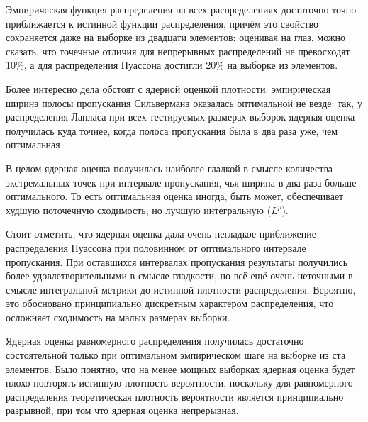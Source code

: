 Эмпирическая функция распределения на всех распределениях достаточно точно приближается к истинной функции распределения, причём это свойство сохраняется даже на выборке из двадцати элементов: оценивая на глаз, можно сказать, что точечные отличия для непрерывных распределений не превосходят 10\%, а для распределения Пуассона достигли 20\% на выборке из 
 элементов.
 
 Более интересно дела обстоят с ядерной оценкой плотности: эмпирическая ширина полосы пропускания Сильвермана оказалась оптимальной не везде: так, у распределения Лапласа при всех тестируемых размерах выборок ядерная оценка получилась куда точнее, когда полоса пропускания была в два раза уже, чем оптимальная
 
 В целом ядерная оценка получилась наиболее гладкой в смысле количества экстремальных точек при интервале пропускания, чья ширина в два раза больше оптимального. То есть оптимальная оценка иногда, быть может, обеспечивает худшую поточечную сходимость, но лучшую интегральную ($L^p$).
 
 Стоит отметить, что ядерная оценка дала очень негладкое приближение распределения Пуассона при половинном от оптимального интервале пропускания. При оставшихся интервалах пропускания результаты получились более удовлетворительными в смысле гладкости, но всё ещё очень неточными в смысле интегральной метрики до истинной плотности распределения.
 Вероятно, это обосновано принципиально дискретным характером распределения, что осложняет сходимость на малых размерах выборки.
 
 Ядерная оценка равномерного распределения получилась достаточно состоятельной только при оптимальном эмпирическом шаге на выборке из ста элементов. Было понятно, что на менее мощных выборках ядерная оценка будет плохо повторять истинную плотность вероятности, поскольку для равномерного распределения теоретическая плотность вероятности является принципиально разрывной, при том что ядерная оценка непрерывная.

